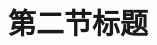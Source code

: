 \documentclass[../../main.tex]{subfiles}%
\begin{document}
\section{第二节标题}

\lipsum[1-3]%
\end{document}
